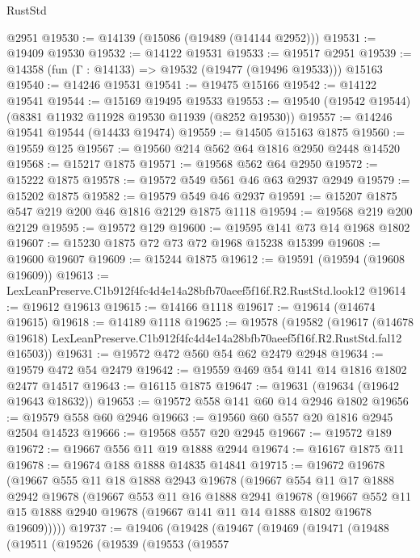 \begin{lexlean}{RustStd}
\begin{coremodule}
    @2951
@19530 := @14139 (@15086 (@19489 (@14144 @2952)))
@19531 := @19409 @19530
@19532 := @14122 @19531
@19533 := @19517 @2951
@19539 := @14358 (fun (Γ : @14133) => @19532 (@19477 (@19496 @19533))) @15163
@19540 := @14246 @19531
@19541 := @19475 @15166
@19542 := @14122 @19541
@19544 := @15169 @19495 @19533
@19553 := @19540 (@19542 @19544) (@8381 @11932 @11928 @19530 @11939 (@8252 @19530))
@19557 := @14246 @19541 @19544 (@14433 @19474)
@19559 := @14505 @15163 @1875
@19560 := @19559 @125
@19567 := @19560 @214 @562 @64 @1816 @2950 @2448 @14520
@19568 := @15217 @1875
@19571 := @19568 @562 @64 @2950
@19572 := @15222 @1875
@19578 := @19572 @549 @561 @46 @63 @2937 @2949
@19579 := @15202 @1875
@19582 := @19579 @549 @46 @2937
@19591 := @15207 @1875 @547 @219 @200 @46 @1816 @2129 @1875 @1118
@19594 := @19568 @219 @200 @2129
@19595 := @19572 @129
@19600 := @19595 @141 @73 @14 @1968 @1802
@19607 := @15230 @1875 @72 @73 @72 @1968 @15238 @15399
@19608 := @19600 @19607
@19609 := @15244 @1875
@19612 := @19591 (@19594 (@19608 @19609))
@19613 := LexLeanPreserve.C1b912f4fc4d4e14a28bfb70aeef5f16f.R2.RustStd.look12
@19614 := @19612 @19613
@19615 := @14166 @1118
@19617 := @19614 (@14674 @19615)
@19618 := @14189 @1118
@19625 := @19578
    (@19582
      (@19617
        (@14678 @19618)
        LexLeanPreserve.C1b912f4fc4d4e14a28bfb70aeef5f16f.R2.RustStd.fal12
        @16503))
@19631 := @19572 @472 @560 @54 @62 @2479 @2948
@19634 := @19579 @472 @54 @2479
@19642 := @19559 @469 @54 @141 @14 @1816 @1802 @2477 @14517
@19643 := @16115 @1875
@19647 := @19631 (@19634 (@19642 @19643 @18632))
@19653 := @19572 @558 @141 @60 @14 @2946 @1802
@19656 := @19579 @558 @60 @2946
@19663 := @19560 @60 @557 @20 @1816 @2945 @2504 @14523
@19666 := @19568 @557 @20 @2945
@19667 := @19572 @189
@19672 := @19667 @556 @11 @19 @1888 @2944
@19674 := @16167 @1875 @11
@19678 := @19674 @188 @1888 @14835 @14841
@19715 := @19672
    @19678
    (@19667
      @555
      @11
      @18
      @1888
      @2943
      @19678
      (@19667
        @554
        @11
        @17
        @1888
        @2942
        @19678
        (@19667
          @553
          @11
          @16
          @1888
          @2941
          @19678
          (@19667
            @552
            @11
            @15
            @1888
            @2940
            @19678
            (@19667 @141 @11 @14 @1888 @1802 @19678 @19609)))))
@19737 := @19406
    (@19428
      (@19467
        (@19469
          (@19471
            (@19488
              (@19511
                (@19526
                  (@19539
                    (@19553
                      (@19557

\end{coremodule}
\end{lexlean}

